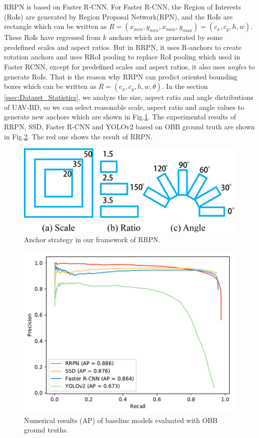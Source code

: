 RRPN is based on Faster R-CNN. For Faster R-CNN, the Region of Interests (RoIs) are generated by Region Proposal Network(RPN), and the RoIs are rectangle which can be written as $ R = (x_{min}, y_{min}, x_{max}, y_{max}) = (c_x, c_y, h, w) $. These RoIs have regressed from $ k $ anchors which are generated by some predefined scales and aspect ratios. But in RRPN, it uses R-anchors to create rotation anchors and uses RRoI pooling to replace RoI pooling which used in Faster RCNN, except for predefined scales and aspect ratios, it also uses \textit{angles} to generate RoIs. That is the reason why RRPN can predict oriented bounding boxes which can be written as $ R=(c_x, c_y, h, w, \theta) $. In the section \ref{ssec:Dataset_Statistics}, we analyze the size, aspect ratio and angle distributions of UAV-BD, so we can select reasonable scale, aspect ratio and angle values to generate new anchors which are shown in Fig.\ref{fig:anchors}. The experimental results of RRPN, SSD, Faster R-CNN and YOLOv2 based on OBB ground truth are shown in Fig.\ref{fig:pr_rbbox}. The red one shows the result of RRPN.



\begin{figure}
	\includegraphics[width=\linewidth]{images/scale_ratio_angle.pdf}
	\caption{Anchor strategy in our framework of RRPN.}
	\label{fig:anchors}
\end{figure}

\begin{figure}
	\includegraphics[width=\linewidth]{images/pr_rbbox.pdf}
	\caption{Numerical results (AP) of baseline models evaluated with OBB ground truths.}
	\label{fig:pr_rbbox}
\end{figure}

